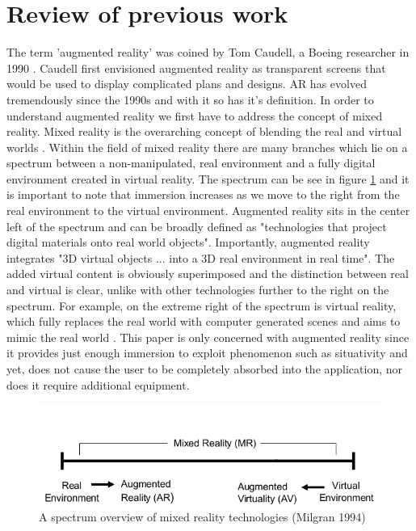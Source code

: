 \documentclass{l4proj}
\begin{document}
\section{Review of previous work} \label{sec:litrew}
The term 'augmented reality' was coined by Tom Caudell, a Boeing researcher in 1990 \cite{rauterberg_history_2002}. Caudell first envisioned augmented reality as transparent screens that would be used to display complicated plans and designs. AR has evolved tremendously since the 1990s and with it so has it's definition. In order to understand augmented reality we first have to address the concept of mixed reality. Mixed reality is the overarching concept of blending the real and virtual worlds \cite{milgram_taxonomy_1994}. Within the field of mixed reality there are many branches which lie on a spectrum between a non-manipulated, real environment and a fully digital environment created in virtual reality. The spectrum can be see in figure \ref{fig:ar-spectrum} and it is important to note that immersion increases as we move to the right from the real environment to the virtual environment. Augmented reality sits in the  center left of the spectrum and can be broadly defined as "technologies that project digital materials onto real world objects"\cite{cuendet_designing_2013}. Importantly, augmented reality integrates  "3D virtual objects ... into a 3D real environment in real time"\cite{azuma_survey_1997}. The added virtual content is obviously superimposed and the distinction between real and virtual is clear, unlike with other technologies further to the right on the spectrum. For example, on the extreme right of the spectrum is virtual reality, which fully replaces the real world with computer generated scenes and aims to mimic the real world \cite{tamura_mixed_2001}. This paper is only concerned with augmented reality since it provides just enough immersion to exploit phenomenon such as situativity and yet, does not cause the user to be completely absorbed into the application, nor does it require additional equipment. 

\begin{figure}
\centering
\includegraphics[scale=1]{images/ar-spectrum.png}
\caption{A spectrum overview of mixed reality technologies (Milgran 1994)}
\label{fig:ar-spectrum}
\end{figure}
\end{document}
